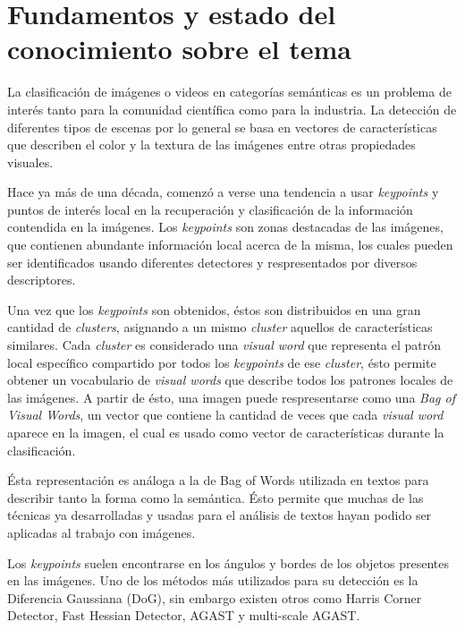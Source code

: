 \section{Fundamentos y estado del conocimiento sobre el tema}
\iffalse
Escriba una breve introducción general al tema y cite y comente las mayores
contribuciones en el tema específico, incluyendo bibliografıa actualizada.
\fi
La clasificación de imágenes o videos en categorías semánticas es un problema de interés tanto para la comunidad científica como
para la industria. La detección de diferentes tipos de escenas por lo general se basa en vectores de características que describen
el color y la textura de las imágenes entre otras propiedades visuales.

Hace ya más de una década, comenzó a verse una tendencia a usar \textit{keypoints} y puntos de interés local en la recuperación y
clasificación de la información contendida en la imágenes. Los \textit{keypoints} son zonas destacadas de las imágenes, que contienen
abundante información local acerca de la misma, los cuales pueden ser identificados usando diferentes detectores y respresentados
por diversos descriptores.

Una vez que los \textit{keypoints} son obtenidos, éstos son distribuidos en una gran cantidad de \textit{clusters}, asignando a un mismo
\textit{cluster} aquellos de características similares. Cada \textit{cluster} es considerado una \textit{visual word}
que representa el patrón local específico compartido por todos los \textit{keypoints} de ese \textit{cluster}, ésto permite obtener un
vocabulario de \textit{visual words} que describe todos los patrones locales de las imágenes. A partir
de ésto, una imagen puede respresentarse como una \textit{Bag of Visual Words}, un vector que contiene
la cantidad de veces que cada \textit{visual word} aparece en la imagen, el cual es usado como vector
de características durante la clasificación.

Ésta representación es análoga a la de Bag of Words utilizada en textos para describir tanto la forma
como la semántica. Ésto permite que muchas de las técnicas ya desarrolladas y usadas para el análisis de textos hayan podido ser aplicadas
al trabajo con imágenes.

Los \textit{keypoints} suelen encontrarse en los ángulos y bordes de los objetos presentes en las imágenes.
Uno de los métodos más utilizados para su detección es la Diferencia Gaussiana (DoG), sin embargo existen otros como
Harris Corner Detector\parencite{harris1988combined}, Fast Hessian Detector\parencite{bay2006surf}, AGAST\parencite{mair2010adaptive} y
multi-scale AGAST\parencite{leutenegger2011brisk}. 


